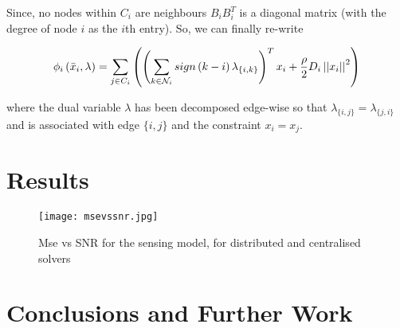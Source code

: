 \documentclass[titlepage]{article}
\begin{document}
Since, no nodes within \(C_i\) are neighbours \(B_iB_i^T\) is a diagonal matrix (with the degree of node \(i\) as the \(i\)th entry). So, we can finally re-write

\begin{equation}
\phi_i\left(\bar{x}_i, \lambda\right) = \sum_{j \in C_i}\left(\left(\sum_{k \in \mathcal{N}_i} sign\left(k-i\right)\lambda_{\{i,k\}}\right)^T x_i + \frac{\rho}{2}D_i\left|\left|x_i\right|\right|^2  \right)
\end{equation}

where the dual variable \(\lambda\) has been decomposed edge-wise so that \(\lambda_{\{i,j\}} = \lambda_{\{j,i\}}\) and is associated with edge \(\{i,j\}\) and the constraint \(x_i = x_j\).

\section{Results}

\begin{figure}
\centering
\texttt{[image: msevssnr.jpg]}
\caption{Mse vs SNR for the sensing model, for distributed and centralised solvers}
\label{msevssnr1}
\end{figure}

\section{Conclusions and Further Work}
\end{document}
